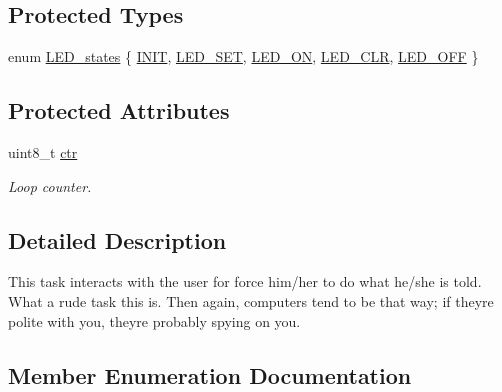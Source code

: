 \subsection*{Protected Types}
\begin{DoxyCompactItemize}
\item 
enum \mbox{\hyperlink{classtask__LED_aa02cb6b5b3999e54620eade54639361a}{L\+E\+D\+\_\+states}} \{ \newline
\mbox{\hyperlink{classtask__LED_aa02cb6b5b3999e54620eade54639361aa9936f05f0ed5abff2fa0cfeeb49a21da}{I\+N\+IT}}, 
\mbox{\hyperlink{classtask__LED_aa02cb6b5b3999e54620eade54639361aa967711b1ba963e8e221d32e5262b8d0f}{L\+E\+D\+\_\+\+S\+ET}}, 
\mbox{\hyperlink{classtask__LED_aa02cb6b5b3999e54620eade54639361aae83fda859a9006b1d580a056fd4fd486}{L\+E\+D\+\_\+\+ON}}, 
\mbox{\hyperlink{classtask__LED_aa02cb6b5b3999e54620eade54639361aaa2f5abad9f27e8be44fed81fd26461f0}{L\+E\+D\+\_\+\+C\+LR}}, 
\newline
\mbox{\hyperlink{classtask__LED_aa02cb6b5b3999e54620eade54639361aa3319c02a8fd253d81da3dabb50974b88}{L\+E\+D\+\_\+\+O\+FF}}
 \}
\end{DoxyCompactItemize}
\subsection*{Protected Attributes}
\begin{DoxyCompactItemize}
\item 
uint8\+\_\+t \mbox{\hyperlink{classtask__LED_ad70fcfd73a9a1bd053c1126fa61b24a7}{ctr}}
\begin{DoxyCompactList}\small\item\em Loop counter. \end{DoxyCompactList}\end{DoxyCompactItemize}


\subsection{Detailed Description}
This task interacts with the user for force him/her to do what he/she is told. What a rude task this is. Then again, computers tend to be that way; if they\textquotesingle{}re polite with you, they\textquotesingle{}re probably spying on you. 

\subsection{Member Enumeration Documentation}
\mbox{\label{classtask__LED_aa02cb6b5b3999e54620eade54639361a}} 
